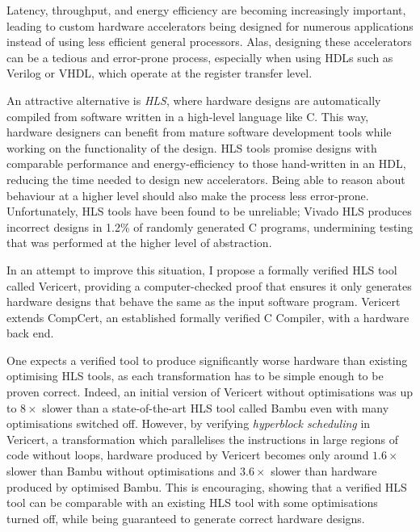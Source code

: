 
Latency, throughput, and energy efficiency are becoming increasingly important,
leading to custom hardware accelerators being designed for numerous applications
instead of using less efficient general processors.  Alas, designing these
accelerators can be a tedious and error-prone process, especially when using
\glspl{HDL} such as Verilog or VHDL, which operate at the register transfer
level.

An attractive alternative is \emph{\gls{HLS}}, where hardware designs are
automatically compiled from software written in a high-level language like C.
This way, hardware designers can benefit from mature software development tools
while working on the functionality of the design.  \gls{HLS} tools promise
designs with comparable performance and energy-efficiency to those hand-written
in an \gls{HDL}, reducing the time needed to design new accelerators.  Being
able to reason about behaviour at a higher level should also make the process
less error-prone.  Unfortunately, \gls{HLS} tools have been found to be
unreliable; Vivado HLS produces incorrect designs in 1.2\% of randomly generated
C programs, undermining testing that was performed at the higher level of
abstraction.

In an attempt to improve this situation, I propose a formally verified \gls{HLS}
tool called Vericert, providing a computer-checked proof that ensures it only
generates hardware designs that behave the same as the input software program.
Vericert extends CompCert, an established formally verified C Compiler, with a
hardware back end.

One expects a verified tool to produce significantly worse hardware than
existing optimising \gls{HLS} tools, as each transformation has to be simple
enough to be proven correct.  Indeed, an initial version of Vericert without
optimisations was up to $8\times$ slower than a state-of-the-art \gls{HLS} tool
called Bambu even with many optimisations switched off.  However, by verifying
\emph{hyperblock scheduling} in Vericert, a transformation which parallelises
the instructions in large regions of code without loops, hardware produced by
Vericert becomes only around $1.6\times$ slower than Bambu without optimisations
and $3.6\times$ slower than hardware produced by optimised Bambu.  This is
encouraging, showing that a verified \gls{HLS} tool can be comparable with an
existing \gls{HLS} tool with some optimisations turned off, while being
guaranteed to generate correct hardware designs.

